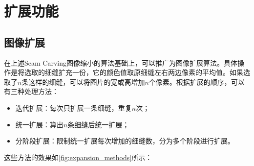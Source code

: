 \documentclass[twoside,a4paper,4pt]{article}
\begin{document}
\section{扩展功能}
\subsection{图像扩展}
在上述Seam Carving图像缩小的算法基础上，可以推广为图像扩展算法。具体操作是将选取的细缝扩充一份，它的颜色值取原细缝左右两边像素的平均值。如果选取了$n$条这样的细缝，可以将图片的宽或高增加$n$个像素。根据扩展的顺序，可以有三种处理方法：
\begin{itemize}
    \item 迭代扩展：每次只扩展一条细缝，重复$n$次；
    \item 统一扩展：算出$n$条细缝后统一扩展；
    \item 分阶段扩展：限制统一扩展每次增加的细缝数，分为多个阶段进行扩展。
\end{itemize}
这些方法的效果如\cref{fig:expansion_methods}所示：
\end{document}
